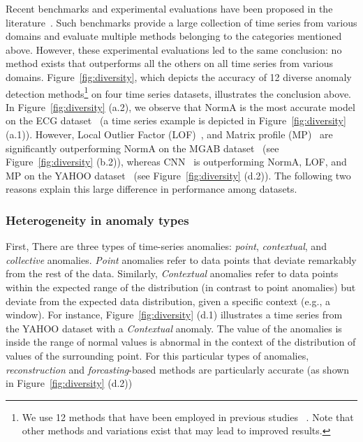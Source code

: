 Recent benchmarks and experimental evaluations have been proposed in the literature~\cite{10.14778/3538598.3538602, 10.14778/3551793.3551830, kdd21}. Such benchmarks provide a large collection of time series from various domains and evaluate multiple methods belonging to the categories mentioned above. However, these experimental evaluations led to the same conclusion: no method exists that outperforms all the others on all time series from various domains. Figure~\ref{fig:diversity}, which depicts the accuracy of 12 diverse anomaly detection methods\footnote{We use 12 methods that have been employed in previous studies ~\cite{10.14778/3529337.3529354, 10.14778/3551793.3551830}. Note that other methods and variations exist that may lead to improved results.} on four time series datasets, illustrates the conclusion above. In Figure~\ref{fig:diversity} (a.2), we observe that NormA is the most accurate model on the ECG dataset~\cite{Moody} (a time series example is depicted in Figure~\ref{fig:diversity} (a.1)). However, Local Outlier Factor (LOF)~\cite{Breunig:2000:LID:342009.335388}, and Matrix profile (MP)~\cite{DBLP:conf/icdm/YehZUBDDSMK16} are significantly outperforming NormA on the MGAB dataset~\cite{markus_thill_2020_3762385} (see Figure~\ref{fig:diversity} (b.2)), whereas CNN~\cite{8581424} is outperforming NormA, LOF, and MP on the YAHOO dataset~\cite{yahoo} (see Figure~\ref{fig:diversity} (d.2)). The following two reasons explain this large difference in performance among datasets.

\vspace{-0.1cm}
\subsubsection{\textbf{Heterogeneity in anomaly types}}

First, There are three types of time-series anomalies: \textit{point}, \textit{contextual}, and \textit{collective} anomalies. \textit{Point} anomalies refer to data points that deviate remarkably from the rest of the data. Similarly, \textit{Contextual} anomalies refer to data points within the expected range of the distribution (in contrast to point anomalies) but deviate from the expected data distribution, given a specific context (e.g., a window). For instance, Figure~\ref{fig:diversity} (d.1) illustrates a time series from the YAHOO dataset with a \textit{Contextual} anomaly. The value of the anomalies is inside the range of normal values is abnormal in the context of the distribution of values of the surrounding point. For this particular types of anomalies, \textit{reconstruction} and \textit{forcasting}-based methods are particularly accurate (as shown in Figure~\ref{fig:diversity} (d.2))

